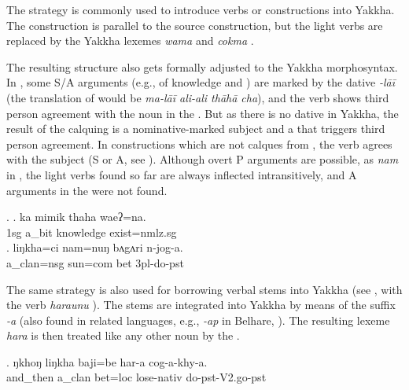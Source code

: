  The  strategy is commonly used to introduce  verbs or  constructions into Yakkha. The construction is parallel to the  source construction, but the  light verbs are replaced by the Yakkha lexemes \emph{wama}  and \emph{cokma} . 
 
 The resulting structure also gets formally adjusted to the Yakkha morphosyntax. In , some S/A arguments  (e.g., of knowledge and ) are marked by the dative \emph{-lāī} (the  translation of \Next[a] would be \emph{ma-lāī ali-ali thāhā cha}), and the verb shows third person agreement with the noun in the . But as there is no dative  in Yakkha, the result of the calquing is a nominative-marked subject and a  that triggers third person agreement. In  constructions which are not calques from , the verb agrees with the subject (S or A, see \Next[b]). Although overt P arguments are possible, as \emph{nam}   in \Next[b], the light verbs found so far are always inflected intransitively, and A arguments in the   were not found.

\ex. \ag. ka mimik   thaha       waeʔ=na.\\
		{\sc 1sg} a\_bit knowledge exist{\sc [3sg]=nmlz.sg}\\
	  
	\bg. liŋkha=ci     nam=nuŋ      bʌgʌri n-jog-a.\\
	a\_clan{\sc =nsg} sun{\sc =com} bet {\sc 3pl-}do{\sc -pst}\\
	 

	
The same strategy  is also used for borrowing  verbal stems into Yakkha (see \Next, with the  verb \emph{haraunu} ). The  stems are integrated into Yakkha by means of the suffix \emph{-a} (also found in related languages, e.g., \emph{-ap} in Belhare, \citealt[559]{Bickel2003Belhare}). The resulting lexeme \emph{hara} is then treated like any other noun by the .

\exg. ŋkhoŋ    liŋkha   baji=be    har-a cog-a-khy-a.\\
and\_then a\_clan bet{\sc =loc} lose{\sc -nativ} do{\sc [3sg]-pst-V2.go-pst}    \\

